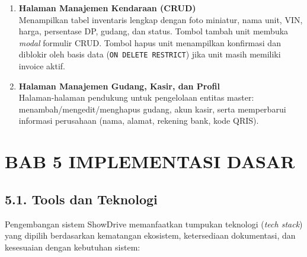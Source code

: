 \documentclass[11pt, a5paper]{article}
\begin{document}
\begin{enumerate}[label=\arabic*.]
  \item \textbf{Halaman Manajemen Kendaraan (CRUD)}\\
        Menampilkan tabel inventaris lengkap dengan foto miniatur, nama unit,
        VIN, harga, persentase DP, gudang, dan status. Tombol tambah unit
        membuka \textit{modal} formulir CRUD. Tombol hapus unit menampilkan
        konfirmasi dan diblokir oleh basis data (\texttt{ON DELETE RESTRICT})
        jika unit masih memiliki invoice aktif.

  \item \textbf{Halaman Manajemen Gudang, Kasir, dan Profil}\\
        Halaman-halaman pendukung untuk pengelolaan entitas master:
        menambah/mengedit/menghapus gudang, akun kasir, serta memperbarui
        informasi perusahaan (nama, alamat, rekening bank, kode QRIS).
\end{enumerate}

\newpage

\section*{BAB 5 IMPLEMENTASI DASAR}

\subsection*{5.1. Tools dan Teknologi}

Pengembangan sistem ShowDrive memanfaatkan tumpukan teknologi (\textit{tech
stack}) yang dipilih berdasarkan kematangan ekosistem, ketersediaan dokumentasi,
dan kesesuaian dengan kebutuhan sistem:
\end{document}
